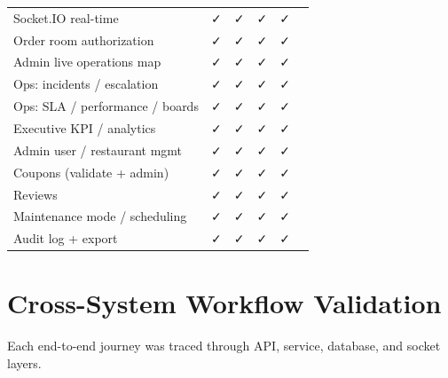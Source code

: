 \documentclass[11pt,a4paper]{article}
\newcommand{\bcomplete}{\badge[ok]{COMPLETE}}
\newcommand{\yes}{\textcolor{ok}{\faCheck}}
\begin{document}
\begin{center}
\begin{longtable}{p{4.3cm}cccc p{2.1cm}}
Socket.IO real-time              & \yes & \yes & \yes & \yes & \bcomplete \\
\rowcolor{rowalt}Order room authorization      & \yes & \yes & \yes & \yes & \bcomplete \\
Admin live operations map         & \yes & \yes & \yes & \yes & \bcomplete \\
Ops: incidents / escalation       & \yes & \yes & \yes & \yes & \bcomplete \\
\rowcolor{rowalt}Ops: SLA / performance / boards & \yes & \yes & \yes & \yes & \bcomplete \\
Executive KPI / analytics         & \yes & \yes & \yes & \yes & \bcomplete \\
Admin user / restaurant mgmt      & \yes & \yes & \yes & \yes & \bcomplete \\
\rowcolor{rowalt}Coupons (validate + admin)    & \yes & \yes & \yes & \yes & \bcomplete \\
Reviews                           & \yes & \yes & \yes & \yes & \bcomplete \\
\rowcolor{rowalt}Maintenance mode / scheduling & \yes & \yes & \yes & \yes & \bcomplete \\
Audit log + export                & \yes & \yes & \yes & \yes & \bcomplete \\
\bottomrule
\end{longtable}
\end{center}

\newpage

\section{Cross-System Workflow Validation}

Each end-to-end journey was traced through API, service, database, and socket layers.
\end{document}
